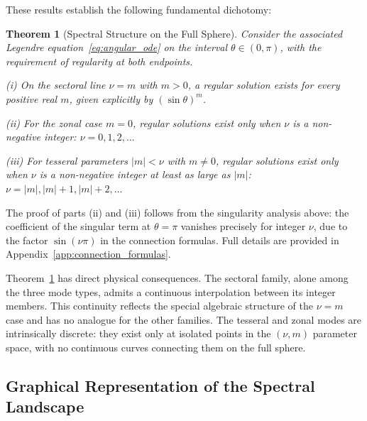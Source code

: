 \documentclass[
  aip,
  amsmath,amssymb,
  preprint
]{revtex4-1}
\newtheorem{theorem}{Theorem}[section]
\begin{document}
These results establish the following fundamental dichotomy:

\begin{theorem}[Spectral Structure on the Full Sphere]
\label{thm:spectral_structure}
Consider the associated Legendre equation~\eqref{eq:angular_ode} on the interval $\theta \in (0, \pi)$, with the requirement of regularity at both endpoints.

\noindent (i) On the sectoral line $\nu = m$ with $m > 0$, a regular solution exists for every positive real $m$, given explicitly by $(\sin\theta)^m$.

\noindent (ii) For the zonal case $m = 0$, regular solutions exist only when $\nu$ is a non-negative integer: $\nu = 0, 1, 2, \ldots$

\noindent (iii) For tesseral parameters $|m| < \nu$ with $m \neq 0$, regular solutions exist only when $\nu$ is a non-negative integer at least as large as $|m|$: $\nu = |m|, |m|+1, |m|+2, \ldots$
\end{theorem}

The proof of parts (ii) and (iii) follows from the singularity analysis above: the coefficient of the singular term at $\theta = \pi$ vanishes precisely for integer $\nu$, due to the factor $\sin(\nu\pi)$ in the connection formulas. Full details are provided in Appendix~\ref{app:connection_formulas}.

Theorem~\ref{thm:spectral_structure} has direct physical consequences. The sectoral family, alone among the three mode types, admits a continuous interpolation between its integer members. This continuity reflects the special algebraic structure of the $\nu = m$ case and has no analogue for the other families. The tesseral and zonal modes are intrinsically discrete: they exist only at isolated points in the $(\nu, m)$ parameter space, with no continuous curves connecting them on the full sphere.


\subsection{Graphical Representation of the Spectral Landscape}
\end{document}
